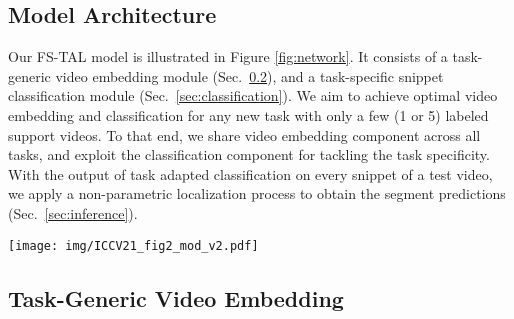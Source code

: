 \documentclass{bmvc2k}
\begin{document}
\subsection{Model Architecture}
Our FS-TAL model is illustrated in Figure \ref{fig:network}. 
It consists of a 
task-generic video embedding module (Sec.~\ref{sec:video_embedding}),
and a task-specific snippet classification module (Sec.~\ref{sec:classification}).
We aim to achieve optimal video embedding and classification
for any new task with only a few (1 or 5) labeled support videos.
To that end, we share video embedding component across
all tasks, and exploit the classification component 
for tackling the task specificity.
With the output of task adapted classification on every snippet of a test video, we apply a non-parametric localization process
to obtain the segment predictions (Sec.~\ref{sec:inference}).







\begin{figure*}[]
\begin{center}
  \texttt{[image: img/ICCV21\_fig2\_mod\_v2.pdf]}
\end{center}
\caption{\textbf{Overview of the proposed FS-TAL deep learning architecture.} 
There are two main modules:
(1) Video embedding for feature representation:
It is pre-trained on the whole training set, and shared by all different tasks 
for more effective knowledge transfer from training classes to test classes.
(2) Snippet classification for foreground prediction:
It is learned specifically for every individual task in two steps.
Initialized with the average of foreground snippet features, the first step learns the classifier on the support videos
in a supervised manner.
The second step further adapts the classifier weights
to every query video with a query adaptive Transformer.
The Transformer is meta-trained.
The final localization result is obtained by thresholding snippet-level classification scores and temporal non-maximum suppression.}
\vspace{-.2in}
\label{fig:network}
\end{figure*}



\subsection{Task-Generic Video Embedding}
\label{sec:video_embedding}
\end{document}
